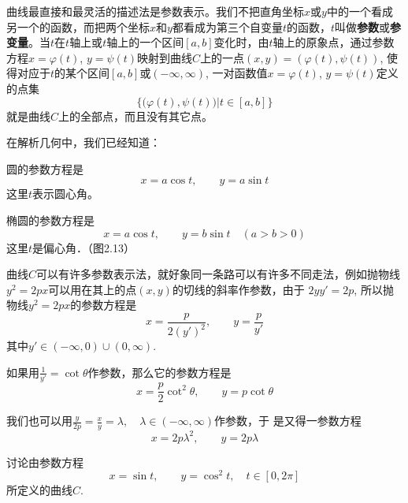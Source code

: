 曲线最直接和最灵活的描述法是参数表示。我们不把直角坐标$x$或$y$中的一个看成另一个的函数，而把两个坐标$x$和$y$都看成为第三个自变量$t$的函数，$t$叫做\textbf{参数}或\textbf{参变量}。当$t$在$t$轴上或$t$轴上的一个区间$[a,b]$变化时，由$t$轴上的原象点，通过参数方程$x=\varphi(t)$, $y=\psi(t)$映射到曲线$C$上的一点$(x,y)=(\varphi(t),\psi(t))$, 使得对应于$t$的某个区间$[a,b]$或$(-\infty, \infty)$, 一对函数值$x=\varphi(t)$, $y=\psi(t)$定义的点集
$$\Big\{\big(\varphi(t), \psi(t)\big)\Big|t\in [a,b]\Big\}$$
就是曲线$C$上的全部点，而且没有其它点。

在解析几何中，我们已经知道：

圆的参数方程是
\[x=a\cos t,\qquad y=a\sin t\]
这里$t$表示圆心角。

椭圆的参数方程是
\[x=a\cos t,\qquad y=b\sin t\quad (a>b>0)\]
这里$t$是偏心角．（图2.13）

\begin{figure}[htp]
    \centering
{}
    \caption{}
\end{figure}

曲线$C$可以有许多参数表示法，就好象同一条路可以有许多不同走法，例如抛物线$y^2=2px$可以用在其上的点$(x,y)$的切线的斜率作参数，由于
$2yy'=2p$, 所以抛物线$y^2=2px$的参数方程是
\[x=\frac{p}{2(y')^2},\qquad y=\frac{p}{y'}\]
其中$y'\in (-\infty,0)\cup (0, \infty)$.

如果用$\frac{1}{y'}=\cot\theta$作参数，那么它的参数方程是
\[x=\frac{p}{2}\cot^2 \theta,\qquad y=p\cot\theta\]

我们也可以用$\frac{y}{2p}=\frac{x}{y}=\lambda,\quad \lambda\in (-\infty, \infty)$作参数，于
是又得一参数方程
\[x=2p\lambda^2,\qquad y=2p\lambda\]


\begin{example}
讨论由参数方程
\[x=\sin t,\qquad y=\cos^2 t,\quad t\in[0,2\pi]\]
所定义的曲线$C$.
\end{example}

